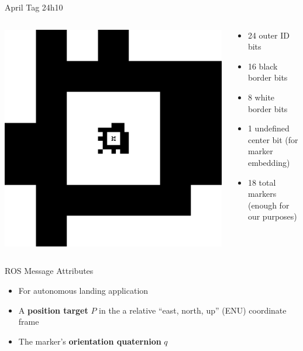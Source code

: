 \documentclass[aspectratio=169]{beamer}
\begin{document}
\begin{frame}{April Tag 24h10}
	\begin{columns}
	\begin{column}{0.4\textwidth}
		\centering
		\includegraphics[width=\linewidth]{./images/tagCustom24h10_00002_00001_00000.png}
	\end{column}
	\begin{column}{0.6\textwidth}
	\begin{itemize}
		\item 24 outer ID bits
		\item 16 black border bits
		\item 8 white border bits
		\item 1 undefined center bit (for marker embedding)
		\item 18 total markers (enough for our purposes)
	\end{itemize}
	\end{column}
	\end{columns}
\end{frame}

\begin{frame}{ROS Message Attributes}
	\begin{itemize}
		\item For autonomous landing application
		\item A \textbf{position target} $P$ in the a relative
			``east, north, up'' (ENU) coordinate frame
		\item The marker's \textbf{orientation quaternion} $q$
	\end{itemize}
\end{frame}
\end{document}
